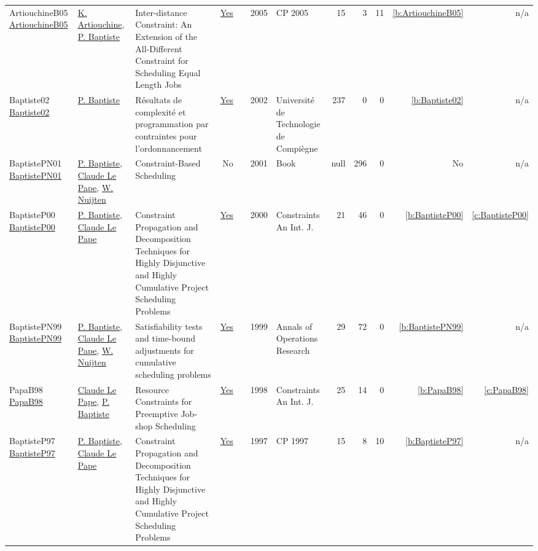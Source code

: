 {\begin{longtable}{>{\raggedright\arraybackslash}p{3cm}>{\raggedright\arraybackslash}p{6cm}>{\raggedright\arraybackslash}p{6.5cm}rrrp{2.5cm}rrrrr}
ArtiouchineB05 \href{https://doi.org/10.1007/11564751_8}{ArtiouchineB05} & \hyperref[auth:a264]{K. Artiouchine}, \hyperref[auth:a163]{P. Baptiste} & Inter-distance Constraint: An Extension of the All-Different Constraint for Scheduling Equal Length Jobs & \href{../works/ArtiouchineB05.pdf}{Yes} & \cite{ArtiouchineB05} & 2005 & CP 2005 & 15 & 3 & 11 & \ref{b:ArtiouchineB05} & n/a\\
Baptiste02 \href{https://theses.hal.science/tel-00124998}{Baptiste02} & \hyperref[auth:a163]{P. Baptiste} & {R{\'e}sultats de complexit{\'e} et programmation par contraintes pour l'ordonnancement} & \href{../works/Baptiste02.pdf}{Yes} & \cite{Baptiste02} & 2002 & {Universit{\'e} de Technologie de Compi{\`e}gne} & 237 & 0 & 0 & \ref{b:Baptiste02} & n/a\\
BaptistePN01 \href{http://dx.doi.org/10.1007/978-1-4615-1479-4}{BaptistePN01} & \hyperref[auth:a163]{P. Baptiste}, \hyperref[auth:a164]{Claude Le Pape}, \hyperref[auth:a662]{W. Nuijten} & Constraint-Based Scheduling & No & \cite{BaptistePN01} & 2001 & Book & null & 296 & 0 & No & n/a\\
BaptisteP00 \href{https://doi.org/10.1023/A:1009822502231}{BaptisteP00} & \hyperref[auth:a163]{P. Baptiste}, \hyperref[auth:a164]{Claude Le Pape} & Constraint Propagation and Decomposition Techniques for Highly Disjunctive and Highly Cumulative Project Scheduling Problems & \href{../works/BaptisteP00.pdf}{Yes} & \cite{BaptisteP00} & 2000 & Constraints An Int. J. & 21 & 46 & 0 & \ref{b:BaptisteP00} & \ref{c:BaptisteP00}\\
BaptistePN99 \href{http://dx.doi.org/10.1023/a:1018995000688}{BaptistePN99} & \hyperref[auth:a163]{P. Baptiste}, \hyperref[auth:a164]{Claude Le Pape}, \hyperref[auth:a662]{W. Nuijten} & Satisfiability tests and time-bound adjustments for cumulative scheduling problems & \href{../works/BaptistePN99.pdf}{Yes} & \cite{BaptistePN99} & 1999 & Annals of Operations Research & 29 & 72 & 0 & \ref{b:BaptistePN99} & n/a\\
PapaB98 \href{https://doi.org/10.1023/A:1009723704757}{PapaB98} & \hyperref[auth:a164]{Claude Le Pape}, \hyperref[auth:a163]{P. Baptiste} & Resource Constraints for Preemptive Job-shop Scheduling & \href{../works/PapaB98.pdf}{Yes} & \cite{PapaB98} & 1998 & Constraints An Int. J. & 25 & 14 & 0 & \ref{b:PapaB98} & \ref{c:PapaB98}\\
BaptisteP97 \href{https://doi.org/10.1007/BFb0017454}{BaptisteP97} & \hyperref[auth:a163]{P. Baptiste}, \hyperref[auth:a164]{Claude Le Pape} & Constraint Propagation and Decomposition Techniques for Highly Disjunctive and Highly Cumulative Project Scheduling Problems & \href{../works/BaptisteP97.pdf}{Yes} & \cite{BaptisteP97} & 1997 & CP 1997 & 15 & 8 & 10 & \ref{b:BaptisteP97} & n/a\\

\end{longtable}}
